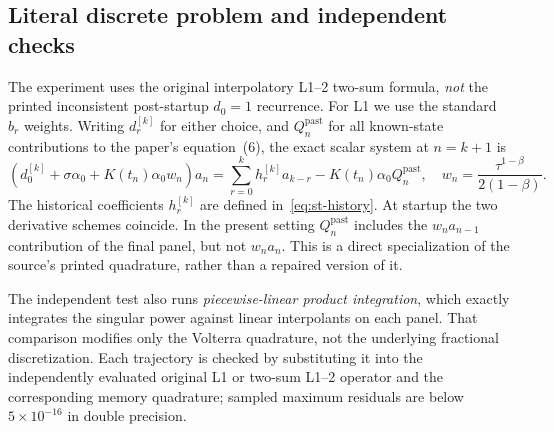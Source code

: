 \documentclass[11pt,a4paper]{amsart}
\theoremstyle{remark}
\theoremstyle{plain}
\theoremstyle{remark}
\numberwithin{equation}{section}
\begin{document}
\subsection{Literal discrete problem and independent checks}
The experiment uses the original interpolatory L1--2 two-sum formula, \emph{not} the printed inconsistent post-startup $d_0=1$ recurrence. For L1 we use the standard $b_r$ weights. Writing $d_r^{[k]}$ for either choice, and $Q_n^{\mathrm{past}}$ for all known-state contributions to the paper's equation~(6), the exact scalar system at $n=k+1$ is
\begin{equation}\label{eq:st04-rec}
 \left(d_0^{[k]}+\sigma\alpha_0+K(t_n)\alpha_0 w_n\right)a_n
 =\sum_{r=0}^{k}h_r^{[k]}a_{k-r}
   -K(t_n)\alpha_0Q_n^{\mathrm{past}},
 \quad w_n=\frac{\tau^{1-\beta}}{2(1-\beta)}.
\end{equation}
The historical coefficients $h_r^{[k]}$ are defined in~\eqref{eq:st-history}. At startup the two derivative schemes coincide. In the present setting $Q_n^{\mathrm{past}}$ includes the $w_na_{n-1}$ contribution of the final panel, but not $w_na_n$. This is a direct specialization of the source's printed quadrature, rather than a repaired version of it.

The independent test also runs \emph{piecewise-linear product integration}, which exactly integrates the singular power against linear interpolants on each panel. That comparison modifies only the Volterra quadrature, not the underlying fractional discretization. Each trajectory is checked by substituting it into the independently evaluated original L1 or two-sum L1--2 operator and the corresponding memory quadrature; sampled maximum residuals are below $5\times10^{-16}$ in double precision.
\end{document}
